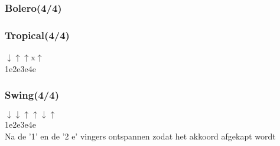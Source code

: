 \subsubsection*{Bolero(4/4)}

\subsubsection*{Tropical(4/4)}
$\downarrow$\hspace{2em}\hphantom{$\uparrow$}\hspace{2em}\hphantom{x}\hspace{2em}$\uparrow$\hspace{2em}\hphantom{$\downarrow$}\hspace{2.2em}$\uparrow$\hspace{2em}x\hspace{2em}$\uparrow$\\
1\hspace{2em}e\hspace{2em}2\hspace{2em}e\hspace{2em}3\hspace{2em}e\hspace{2em}4\hspace{2em}e\\

\subsubsection*{Swing(4/4)}
$\downarrow$\hspace{2em}\hphantom{$\uparrow$}\hspace{2em}$\downarrow$\hspace{2em}$\uparrow$\hspace{2em}\hphantom{$\downarrow$}\hspace{2.1em}$\uparrow$\hspace{2.1em}$\downarrow$\hspace{2em}$\uparrow$\\
1\hspace{2em}e\hspace{2em}2\hspace{2em}e\hspace{2em}3\hspace{2em}e\hspace{2em}4\hspace{2em}e\\
Na de '1' en de '2 e' vingers ontspannen zodat het akkoord afgekapt wordt\\

